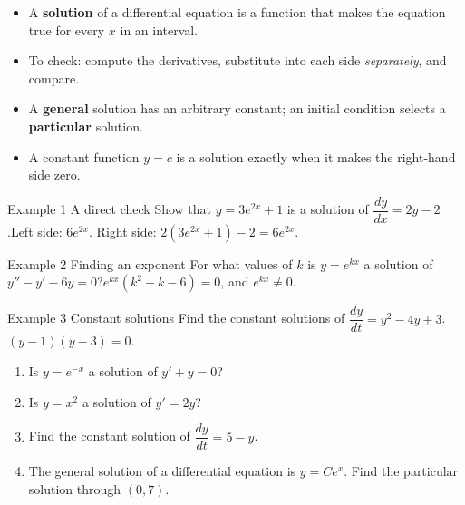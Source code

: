 \documentclass[11pt]{article}
\begin{document}

\begin{ideabox}
\begin{itemize}[leftmargin=*,itemsep=2pt,topsep=2pt]
  \item A \textbf{solution} of a differential equation is a function that makes the equation true for every $x$ in an interval.
  \item To check: compute the derivatives, substitute into each side \emph{separately}, and compare.
  \item A \textbf{general} solution has an arbitrary constant; an initial condition selects a \textbf{particular} solution.
  \item A constant function $y=c$ is a solution exactly when it makes the right-hand side zero.
\end{itemize}
\end{ideabox}

\begin{example}{Example 1 \textperiodcentered{} A direct check}
Show that $y=3e^{2x}+1$ is a solution of $\dfrac{dy}{dx}=2y-2$.\soln Left side: $6e^{2x}$. Right side: $2\left(3e^{2x}+1\right)-2=6e^{2x}$.
\end{example}

\begin{example}{Example 2 \textperiodcentered{} Finding an exponent}
For what values of $k$ is $y=e^{kx}$ a solution of $y''-y'-6y=0$?\soln $e^{kx}\left(k^2-k-6\right)=0$, and $e^{kx}\neq0$.
\end{example}

\begin{example}{Example 3 \textperiodcentered{} Constant solutions}
Find the constant solutions of $\dfrac{dy}{dt}=y^2-4y+3$.\soln $(y-1)(y-3)=0$.
\end{example}

\newpage
{}

\begin{enumerate}[leftmargin=*,itemsep=2pt]
  \item Is $y=e^{-x}$ a solution of $y'+y=0$?\work{2.3cm}
  \item Is $y=x^2$ a solution of $y'=2y$?\work{2.3cm}
  \item Find the constant solution of $\dfrac{dy}{dt}=5-y$.\work{2.3cm}
  \item The general solution of a differential equation is $y=Ce^{x}$. Find the particular solution through $(0,7)$.\work{2.3cm}
\end{enumerate}
\end{document}
